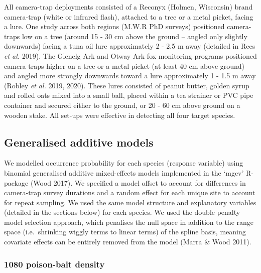 \documentclass[11pt,a4paper,titlepage,twoside,openright]{style/unimelbthesis}
\begin{document}
\begin{mainmatter}
All camera-trap deployments consisted of a Reconyx (Holmen, Wisconsin) brand camera-trap (white or infrared flash), attached to a tree or a metal picket, facing a lure. One study across both regions (M.W.R PhD surveys) positioned camera-traps low on a tree (around 15 - 30 cm above the ground -- angled only slightly downwards) facing a tuna oil lure approximately 2 - 2.5 m away (detailed in Rees \emph{et al.} 2019). The Glenelg Ark and Otway Ark fox monitoring programs positioned camera-traps higher on a tree or a metal picket (at least 40 cm above ground) and angled more strongly downwards toward a lure approximately 1 - 1.5 m away (Robley \emph{et al.} 2019, 2020). These lures consisted of peanut butter, golden syrup and rolled oats mixed into a small ball, placed within a tea strainer or PVC pipe container and secured either to the ground, or 20 - 60 cm above ground on a wooden stake. All set-ups were effective in detecting all four target species.

\hypertarget{generalised-additive-models}{%
\subsection{Generalised additive models}\label{generalised-additive-models}}

We modelled occurrence probability for each species (response variable) using binomial generalised additive mixed-effects models implemented in the `mgcv' R-package (Wood 2017). We specified a model offset to account for differences in camera-trap survey durations and a random effect for each unique site to account for repeat sampling. We used the same model structure and explanatory variables (detailed in the sections below) for each species. We used the double penalty model selection approach, which penalises the null space in addition to the range space (i.e.~shrinking wiggly terms to linear terms) of the spline basis, meaning covariate effects can be entirely removed from the model (Marra \& Wood 2011).

\hypertarget{poison-bait-density}{%
\subsubsection{1080 poison-bait density}\label{poison-bait-density}}


\end{mainmatter}
\end{document}
